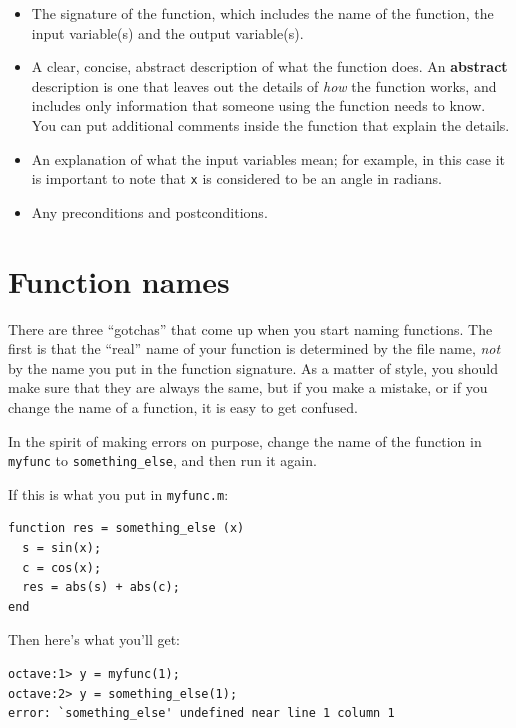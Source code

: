 \documentclass{book}
\begin{document}
\begin{itemize}

\item The signature of the function, which includes the name
of the function, the input variable(s) and the output variable(s).

\item A clear, concise, abstract description of what the function does.
An {\bf abstract} description is one that leaves out the
details of {\em how} the function works, and includes only information
that someone using the function needs to know. You can put additional
comments inside the function that explain the details.

\item An explanation of what the input variables mean; for example,
in this case it is important to note that {\tt x} is considered
to be an angle in radians.

\item Any preconditions and postconditions.

\end{itemize}



\section{Function names}

There are three ``gotchas'' that come up when you start naming
functions. The first is that the ``real'' name of your function
is determined by the file name, {\em not} by the name
you put in the function signature. As a matter of style, you
should make sure that they are always the same, but if you
make a mistake, or if you change the name of a function, it is
easy to get confused.

In the spirit of making errors on purpose, change the name of
the function in {\tt myfunc} to {\tt something\_else}, and
then run it again.

If this is what you put in {\tt myfunc.m}:

\begin{verbatim}
function res = something_else (x)
  s = sin(x);
  c = cos(x);
  res = abs(s) + abs(c);
end
\end{verbatim}

Then here's what you'll get:

\begin{verbatim}
octave:1> y = myfunc(1);
octave:2> y = something_else(1);
error: `something_else' undefined near line 1 column 1
\end{verbatim}
\end{document}
